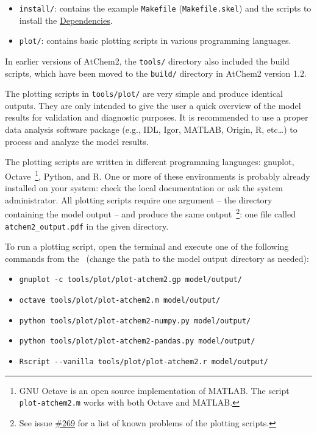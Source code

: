 \begin{itemize}
\item \texttt{install/}: contains the example \texttt{Makefile}
  (\texttt{Makefile.skel}) and the scripts to install the
  \hyperref[sec:dependencies]{Dependencies}.
\item \texttt{plot/}: contains basic plotting scripts in various
  programming languages.
\end{itemize}

In earlier versions of AtChem2, the \texttt{tools/} directory also
included the build scripts, which have been moved to the
\texttt{build/} directory in AtChem2 version 1.2.

The plotting scripts in \texttt{tools/plot/} are very simple and
produce identical outputs. They are only intended to give the user a
quick overview of the model results for validation and diagnostic
purposes. It is recommended to use a proper data analysis software
package (e.g., IDL, Igor, MATLAB, Origin, R, etc\ldots) to process and
analyze the model results.

The plotting scripts are written in different programming languages:
gnuplot, Octave~\footnote{GNU Octave is an open source implementation
  of MATLAB. The script \texttt{plot-atchem2.m} works with both Octave
  and MATLAB.}, Python, and R. One or more of these environments is
probably already installed on your system: check the local
documentation or ask the system administrator. All plotting scripts
require one argument -- the directory containing the model output --
and produce the same output~\footnote{See issue
  \href{https://github.com/AtChem/AtChem2/issues/269}{\#269} for a
  list of known problems of the plotting scripts.}: one file called
\texttt{atchem2\_output.pdf} in the given directory.

To run a plotting script, open the terminal and execute one of the
following commands from the \maindir\ (change the path to the model
output directory as needed):

\begin{itemize}
\item \verb|gnuplot -c tools/plot/plot-atchem2.gp model/output/|
\item \verb|octave tools/plot/plot-atchem2.m model/output/|
\item \verb|python tools/plot/plot-atchem2-numpy.py model/output/|
\item \verb|python tools/plot/plot-atchem2-pandas.py model/output/|
\item \verb|Rscript --vanilla tools/plot/plot-atchem2.r model/output/|
\end{itemize}

